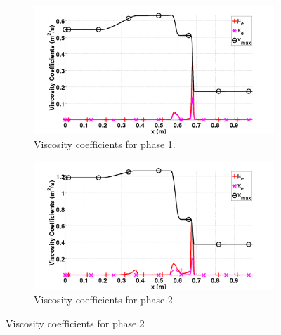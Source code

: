 \documentclass[preprint,10pt]{elsarticle}
\begin{document}
\begin{figure}[H]
        \centering
        \begin{subfigure}[b]{0.495\textwidth}
                \centering
                \includegraphics[width=\textwidth]{figures/relaxation_phase_1_viscosity_kappa_mu.png}
                \caption{Viscosity coefficients for phase 1.}
                \label{fig:inf-rel-visc-coeff-phase-1}
        \end{subfigure}%
        \begin{subfigure}[b]{0.495\textwidth}
                \centering
                \includegraphics[width=\textwidth]{figures/relaxation_phase_2_viscosity_kappa_mu.png}
                \caption{Viscosity coefficients for phase 2}
                \label{fig:inf-rel-visc-coeff-phase-2}
        \end{subfigure}
        

\end{figure}
\end{document}
